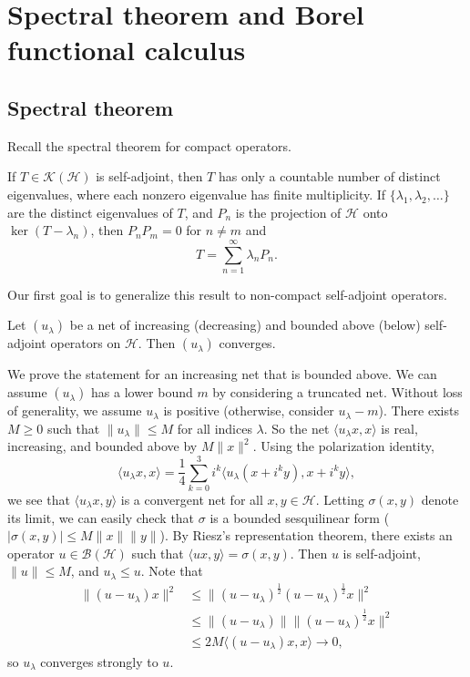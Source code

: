 \section{Spectral theorem and Borel functional calculus}

\subsection{Spectral theorem}

Recall the spectral theorem for compact operators.

\begin{theorem}
  If $T \in \mathcal{K} (\mathcal{H})$ is self-adjoint, then $T$ 
  has only a countable number of distinct eigenvalues, where each nonzero eigenvalue has finite multiplicity.
  If $\{\lambda_1, \lambda_2, \dots\}$ are the distinct eigenvalues of $T$,
  and $P_n$ is the projection of $\mathcal{H}$ onto $\ker (T - \lambda_n)$, 
  then $P_n P_m = 0$ for $n \neq m$ and 
  $$T = \sum_{n = 1} ^\infty \lambda_n P_n.$$
\end{theorem}

Our first goal is to generalize this result to non-compact self-adjoint operators.

\begin{theorem}[Vigier]
  Let $(u_\lambda)$ be a net of increasing (decreasing) and bounded above (below) self-adjoint operators on $\mathcal{H}$.
  Then $(u_\lambda)$ converges.
\end{theorem}

\begin{myproof}
  We prove the statement for an increasing net that is bounded above. We can assume $(u_\lambda)$ has a lower bound $m$ by considering a truncated net. 
  Without loss of generality, we assume $u_\lambda$ is positive (otherwise, consider $u_\lambda - m$).
  There exists $M \geq 0$ such that $\|u_\lambda\| \leq M$ for all indices $\lambda$. So the net $\langle u_\lambda x, x\rangle$
  is real, increasing, and bounded above by $M \|x\|^2$. Using the polarization identity, 
  $$\langle u_\lambda x, x\rangle = \frac{1}{4} \sum_{k = 0} ^3 i^k \langle u_\lambda (x + i^k y), x + i^k y\rangle,$$
  we see that $\langle u_\lambda x, y\rangle$ is a convergent net for all $x, y \in \mathcal{H}$.
  Letting $\sigma(x, y)$ denote its limit, we can easily check that $\sigma$ is a bounded sesquilinear form ($|\sigma(x, y)| \leq M\|x\| \|y\|$).
  By Riesz's representation theorem, there exists an operator $u \in \mathcal{B} (\mathcal{H})$ such that $\langle ux, y\rangle = \sigma(x, y)$.
  Then $u$ is self-adjoint, $\|u\| \leq M$, and $u_\lambda \leq u$. Note that 
  \begin{align*}
    \| (u - u_\lambda)x\|^2 &\leq \| (u - u_\lambda)^{\frac{1}{2}} (u - u_\lambda)^{\frac{1}{2}} x \|^2\\
    &\leq \| (u - u_\lambda) \| \| (u - u_\lambda)^{\frac{1}{2}} x\|^2\\
    &\leq 2M \langle (u - u_\lambda)x, x\rangle \to 0,
  \end{align*}
  so $u_\lambda$ converges strongly to $u$.
\end{myproof}

